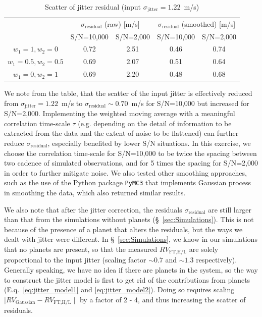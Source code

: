\begin{table}[htbp]
\centering
\begin{tabular}{|c|c|c|c|c|}
\hline
\multirow{2}{*}{} 	& \multicolumn{2}{c|}{$\sigma_\text{residual}$ (raw) [m/s]}  & \multicolumn{2}{c|}{$\sigma_\text{residual}$ (smoothed) [m/s]}  \\ \cline{2-5} 
                  	& \multicolumn{1}{l|}{S/N=10,000} & \multicolumn{1}{l|}{S/N=2,000} & \multicolumn{1}{l|}{S/N=10,000} & \multicolumn{1}{l|}{S/N=2,000} \\ \hline
$w_1=1, w_2=0$  	 	& 0.72 		& 2.51 			& 0.46 			& 0.74                              \\ \hline
$w_1=0.5, w_2=0.5$  & 0.69 		& 2.07			& 0.51			& 0.64                              \\ \hline
$w_1=0, w_2=1$      & 0.69		& 2.20			& 0.48 			& 0.68                              \\ \hline
\end{tabular}
\caption{Scatter of jitter residual (input $\sigma_\text{jitter} = 1.22$~m/s)}
\label{table:jitter_model_scatter}
\end{table}

We note from the table, that the scatter of the input jitter is effectively reduced from $\sigma_\text{jitter} = 1.22$~m/s to $\sigma_\text{residual} \sim 0.70$~m/s for S/N=10,000 but increased for S/N=2,000. Implementing the weighted moving average with a meaningful correlation time-scale $\tau$ (e.g. depending on the detail of information to be extracted from the data and the extent of noise to be flattened) can further reduce $\sigma_\text{residual}$, especially benefited by lower S/N situations. In this exercise, we choose the correlation time-scale for S/N=10,000 to be twice the spacing between two cadence of simulated observations, and for 5 times the spacing for S/N=2,000 in order to further mitigate noise. We also tested other smoothing approaches, such as the use of the Python package \verb|PyMC3| that implements Gaussian process in smoothing the data, which also returned similar results. 

We also note that after the jitter correction, the residuals $\sigma_\text{residual}$ are still larger than that from the simulations without planets (\S~\ref{sec:Simulations}). This is not because of the presence of a planet that alters the residuals, but the ways we dealt with jitter were different. In \S~\ref{sec:Simulations}, we know in our simulations that no planets are present, so that the measured $RV_\text{FT,H/L}$ are solely proportional to the input jitter (scaling factor $\sim 0.7$ and $\sim 1.3$ respectively). Generally speaking, we have no idea if there are planets in the system, so the way to construct the jitter model is first to get rid of the contributions from planets (E.q.~\ref{eq:jitter_model1} and \ref{eq:jitter_model2}). Doing so requires scaling $\mid RV_\text{Gaussian} - RV_\text{FT,H/L}\mid$ by a factor of 2 - 4, and thus increasing the scatter of residuals. 

